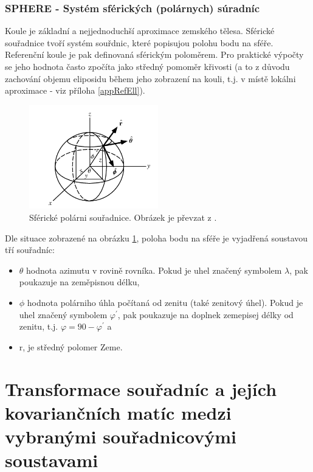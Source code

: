 \documentclass[11pt,a4paper]{article}
\begin{document}
\subsubsection{SPHERE - Systém sférických (polárnych) súradníc}

Koule je základní a nejjednoduchší aproximace zemského tělesa. Sférické souřadnice tvoří systém souřdnic, které popisujou polohu bodu na sféře. Referenční koule je pak definovaná sférickým poloměrem. Pro praktické výpočty se jeho hodnota často zpočíta jako středný pomoměr křivosti (a to z důvodu zachování objemu eliposidu během jeho zobrazení na kouli, t.j. v místě lokálni aproximace - viz příloha \ref{appRefEll}).
 
\begin{figure}[ht!]
\begin{center}
\includegraphics[width=0.50\textwidth]{FIG/sphere_wolf}
\caption{Sférické polárni souřadnice. Obrázek je převzat z \cite{sphereWolf}.}
\label{fig:sphere}
\end{center}
\end{figure}

Dle situace zobrazené na obrázku \ref{fig:sphere}, poloha bodu na sféře je vyjadřená soustavou tří souřadníc:
\begin{itemize}
\item $\theta$ hodnota azimutu v rovině rovníka. Pokud je uhel značený symbolem $\lambda$, pak poukazuje na zeměpisnou délku,
\item $\phi$ hodnota polárniho úhla počítaná od zenitu (také zenitový úhel). Pokud je uhel značený symbolem $\varphi^{'}$, pak poukazuje na doplnek zemepisej délky od zenitu, t.j. $\varphi = 90 - \varphi^{'}$ a
\item r, je středný polomer Zeme.
\end{itemize}

\section{Transformace souřadníc a jejích kovariančních matíc medzi vybranými souřadnicovými soustavami}
\end{document}
